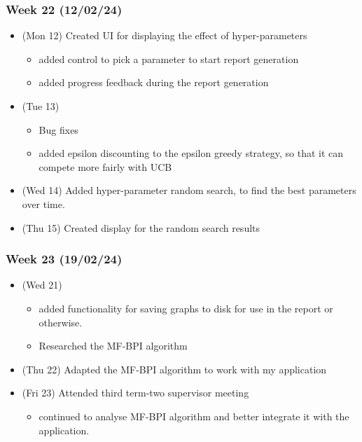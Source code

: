 \hypertarget{week-22-120224}{%
\subsubsection{Week 22 (12/02/24)}\label{week-22-120224}}

\begin{itemize}
\tightlist
\item
  (Mon 12) Created UI for displaying the effect of hyper-parameters

  \begin{itemize}
  \tightlist
  \item
    added control to pick a parameter to start report generation
  \item
    added progress feedback during the report generation
  \end{itemize}
\item
  (Tue 13)

  \begin{itemize}
  \tightlist
  \item
    Bug fixes
  \item
    added epsilon discounting to the epsilon greedy strategy, so that it
    can compete more fairly with UCB
  \end{itemize}
\item
  (Wed 14) Added hyper-parameter random search, to find the best
  parameters over time.
\item
  (Thu 15) Created display for the random search results
\end{itemize}

\hypertarget{week-23-190224}{%
\subsubsection{Week 23 (19/02/24)}\label{week-23-190224}}

\begin{itemize}
\tightlist
\item
  (Wed 21)

  \begin{itemize}
  \tightlist
  \item
    added functionality for saving graphs to disk for use in the report
    or otherwise.
  \item
    Researched the MF-BPI algorithm
  \end{itemize}
\item
  (Thu 22) Adapted the MF-BPI algorithm to work with my application
\item
  (Fri 23) Attended third term-two supervisor meeting

  \begin{itemize}
  \tightlist
  \item
    continued to analyse MF-BPI algorithm and better integrate it with
    the application.
  \end{itemize}
\end{itemize}

